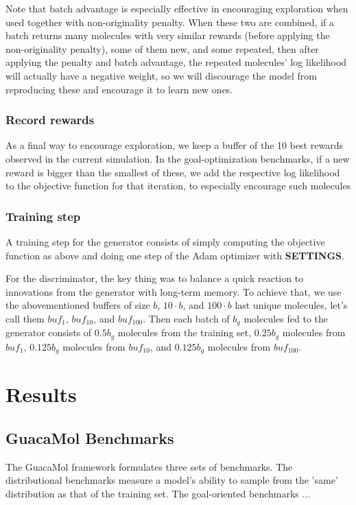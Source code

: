 \documentclass{article}
\begin{document}
Note that batch advantage is especially effective in encouraging exploration when used together with non-originality penalty. When these two are combined, if a batch returns many molecules with very similar rewards (before applying the non-originality penalty), some of them new, and some repeated, then after applying the penalty and batch advantage, the repeated molecules' log likelihood will actually have a negative weight, so we will discourage the model from reproducing these and encourage it to learn new ones.
\subsubsection{Record rewards}
As a final way to encourage exploration, we keep a buffer of the 10 best rewards observed in the current simulation. In the goal-optimization benchmarks, if a new reward is bigger than the smallest of these, we add the respective log likelihood to the objective function for that iteration, to especially encourage such molecules
\subsubsection{Training step}
A training step for the generator consists of simply computing the objective function as above and doing one step of the Adam optimizer with {\bf SETTINGS}. 

For the discriminator, the key thing was to balance a quick reaction to innovations from the generator with long-term memory. To achieve that, we use the abovementioned buffers of size $b$, $10\cdot b$, and $100\cdot b$ last unique molecules, let's call them $buf_1$, $buf_{10}$, and $buf_{100}$. Then each batch of $b_g$ molecules fed to the generator consists of $0.5 b_g$ molecules from the training set, $0.25 b_g$ molecules from $buf_1$,  $0.125 b_g$ molecules from $buf_{10}$, and  $0.125 b_g$ molecules from $buf_{100}$. 

\section{Results}\label{sec:results}
\subsection{GuacaMol Benchmarks}
The GuacaMol framework formulates three sets of benchmarks. The distributional benchmarks measure a model's ability to sample from the 'same' distribution as that of the training set. The goal-oriented benchmarks ...
\end{document}
